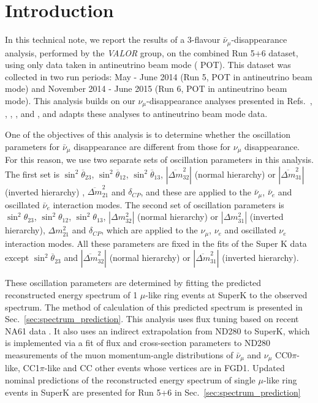 
\section {Introduction}
\label{sec:intro}

In this technical note, we report the results of a 3-flavour $\bar{\nu}_{\mu}$-disappearance analysis,
performed by the {\em VALOR} group,        
on the combined Run 5+6 dataset, using only data taken in antineutrino beam mode (\TotalPot{} POT).
This dataset was collected in two run periods:
May - June 2014 (Run 5, \RunVPot{} POT in antineutrino beam mode) and November 2014 - June 2015 
(Run 6, \RunVIPot{} POT in antineutrino beam mode).
This analysis builds on our $\nu_{\mu}$-disappearance analyses presented in Refs.\ \cite{OurRun1DisappAnalysis}, 
\cite{OurRun12DisappAnalysis}, \cite{OurRun12DisappAnalysis3Flavour}, \cite{OurRun123DisappAnalysis3Flavour},
\cite{OurRun1234aDisappAnalysis3Flavour} and \cite{OurRun1234DisappAnalysis3Flavour}, and adapts these analyses  
to antineutrino beam mode data.

One of the objectives of this analysis is to determine whether the oscillation parameters for $\bar{\nu}_{\mu}$ disappearance are different 
from those for $\nu_{\mu}$ disappearance. For this reason, we use two separate sets of oscillation parameters in this analysis. The first set is
$\sin^{2}\overline{\theta}_{23}$, $\sin^{2}\overline{\theta}_{12}$, $\sin^{2}\overline{\theta}_{13}$, $|\overline{\Delta m}^{2}_{32}|$ 
(normal hierarchy) or $|\overline{\Delta m}^{2}_{31}|$ (inverted hierarchy)
, $\overline{\Delta m}^{2}_{21}$ and $\delta_{CP}$, and these are 
applied to the $\bar{\nu}_{\mu}$, $\bar{\nu}_{e}$ and oscillated $\bar{\nu}_{e}$ interaction modes. The second set of oscillation parameters 
is $\sin^{2}\theta_{23}$, $\sin^{2}\theta_{12}$, $\sin^{2}\theta_{13}$, $|\Delta m^{2}_{32}|$ 
(normal hierarchy) or $|\Delta m^{2}_{31}|$ (inverted hierarchy), 
$\Delta m^{2}_{21}$ and $\delta_{CP}$, which are applied to the $\nu_{\mu}$, $\nu_{e}$ and oscillated $\nu_{e}$
interaction modes. All these parameters are fixed in the fits of the Super K data except $\sin^{2}\overline{\theta}_{23}$ and $|\overline{\Delta m}^{2}_{32}|$ 
(normal hierarchy) or $|\overline{\Delta m}^{2}_{31}|$ (inverted hierarchy).

These oscillation parameters are determined by fitting the predicted reconstructed energy spectrum of 1 $\mu$-like ring 
events at SuperK to the observed spectrum. The method of calculation of this predicted spectrum is presented in Sec.~\ref{sec:spectrum_prediction}.
This analysis uses flux tuning based on recent NA61 data \cite{FluxTuning}\cite{NA61T2K}. 
It also uses an indirect extrapolation from ND280 to SuperK, which is implemented via a fit of flux and cross-section parameters to
ND280 measurements of the muon momentum-angle distributions of $\bar{\nu}_\mu$ and  $\nu_\mu$
CC0$\pi$-like, CC1$\pi$-like and CC other events whose 
vertices are in FGD1\cite{BANFF2015}.
Updated nominal predictions of the reconstructed energy spectrum of single $\mu$-like ring events in SuperK are presented for Run 5+6
in Sec.~\ref{sec:spectrum_prediction}

